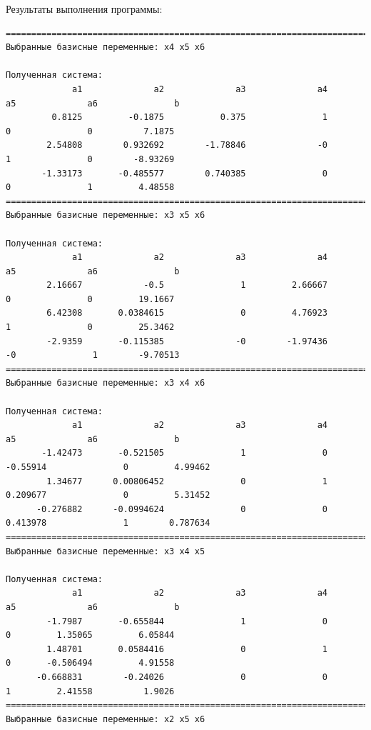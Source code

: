 \documentclass[a4paper,14pt]{extarticle}
\begin{document}
Результаты выполнения программы:
\begin{verbatim}
==================================================================================================================
Выбранные базисные переменные: x4 x5 x6 

Полученная система: 
             a1              a2              a3              a4              a5              a6               b
         0.8125         -0.1875           0.375               1               0               0          7.1875 
        2.54808        0.932692        -1.78846              -0               1               0        -8.93269 
       -1.33173       -0.485577        0.740385               0               0               1         4.48558 
==================================================================================================================
Выбранные базисные переменные: x3 x5 x6 

Полученная система: 
             a1              a2              a3              a4              a5              a6               b
        2.16667            -0.5               1         2.66667               0               0         19.1667 
        6.42308       0.0384615               0         4.76923               1               0         25.3462 
        -2.9359       -0.115385              -0        -1.97436              -0               1        -9.70513 
==================================================================================================================
Выбранные базисные переменные: x3 x4 x6 

Полученная система:
             a1              a2              a3              a4              a5              a6               b
       -1.42473       -0.521505               1               0        -0.55914               0         4.99462 
        1.34677      0.00806452               0               1        0.209677               0         5.31452
      -0.276882      -0.0994624               0               0        0.413978               1        0.787634
==================================================================================================================
Выбранные базисные переменные: x3 x4 x5

Полученная система:
             a1              a2              a3              a4              a5              a6               b
        -1.7987       -0.655844               1               0               0         1.35065         6.05844
        1.48701       0.0584416               0               1               0       -0.506494         4.91558
      -0.668831        -0.24026               0               0               1         2.41558          1.9026
==================================================================================================================
Выбранные базисные переменные: x2 x5 x6


\end{verbatim}
\end{document}
